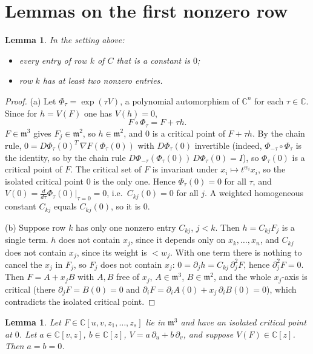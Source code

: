 \documentclass[11pt]{article}
\newcommand{\C}{\mathbb{C}}
\newtheorem{lemma}[theorem]{Lemma}
\theoremstyle{remark}
\begin{document}
\section{Lemmas on the first nonzero row}

\begin{lemma}\label{lem:C}
In the setting above:
\begin{itemize}
\item[(a)] every entry of row $k$ of $C$ that is a constant is $0$;
\item[(b)] row $k$ has at least two nonzero entries.
\end{itemize}
\end{lemma}

\begin{proof}
(a) Let $\Phi_\tau=\exp(\tau V)$, a polynomial automorphism of $\C^n$ for each $\tau\in\C$. Since for $h=V(F)$ one has $V(h)=0$,
\[
F\circ\Phi_\tau=F+\tau h .
\]
$F\in\mathfrak m^3$ gives $F_j\in\mathfrak m^2$, so $h\in\mathfrak m^2$, and $0$ is a critical point of $F+\tau h$. By the chain rule, $0=D\Phi_\tau(0)^T\,\nabla F(\Phi_\tau(0))$ with $D\Phi_\tau(0)$ invertible (indeed, $\Phi_{-\tau}\circ\Phi_\tau$ is the identity, so by the chain rule $D\Phi_{-\tau}(\Phi_\tau(0))\,D\Phi_\tau(0)=I$), so $\Phi_\tau(0)$ is a critical point of $F$. The critical set of $F$ is invariant under $x_i\mapsto t^{w_i}x_i$, so the isolated critical point $0$ is the only one. Hence $\Phi_\tau(0)=0$ for all $\tau$, and $V(0)=\frac{d}{d\tau}\Phi_\tau(0)|_{\tau=0}=0$, i.e.\ $C_{kj}(0)=0$ for all $j$. A weighted homogeneous constant $C_{kj}$ equals $C_{kj}(0)$, so it is $0$.

(b) Suppose row $k$ has only one nonzero entry $C_{kj}$, $j<k$. Then $h=C_{kj}F_j$ is a single term. $h$ does not contain $x_j$, since it depends only on $x_k,\dots,x_n$, and $C_{kj}$ does not contain $x_j$, since its weight is $<w_j$. With one term there is nothing to cancel the $x_j$ in $F_j$, so $F_j$ does not contain $x_j$: $0=\partial_jh=C_{kj}\,\partial_j^2F$, hence $\partial_j^2F=0$. Then $F=A+x_jB$ with $A,B$ free of $x_j$, $A\in\mathfrak m^3$, $B\in\mathfrak m^2$, and the whole $x_j$-axis is critical (there $\partial_jF=B(0)=0$ and $\partial_iF=\partial_iA(0)+x_j\,\partial_iB(0)=0$), which contradicts the isolated critical point.
\end{proof}

\begin{lemma}\label{lem:D}
Let $F\in\C[u,v,z_1,\dots,z_s]$ lie in $\mathfrak m^3$ and have an isolated critical point at $0$. Let $a\in\C[v,z]$, $b\in\C[z]$, $V=a\,\partial_u+b\,\partial_v$, and suppose $V(F)\in\C[z]$. Then $a=b=0$.
\end{lemma}
\end{document}
